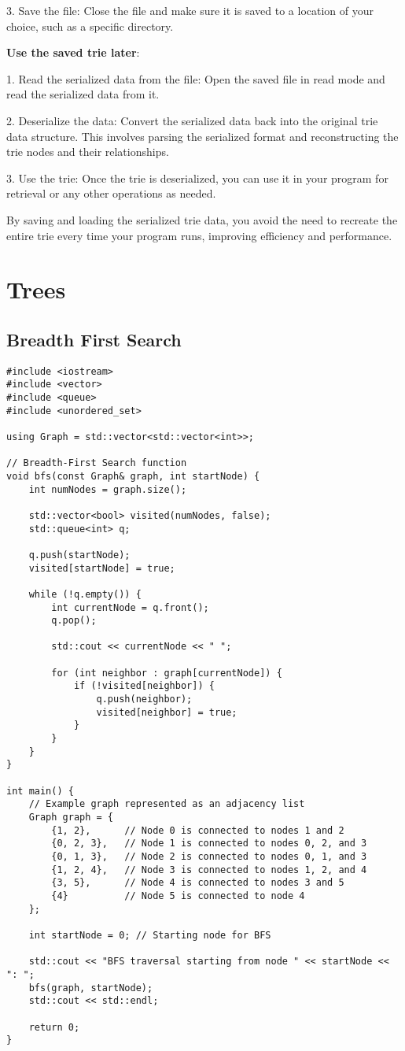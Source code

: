 \documentclass[openany]{report}
\begin{document}
3. Save the file: Close the file and make sure it is saved to a location of your choice,
such as a specific directory.

\textbf{Use the saved trie later}:

1. Read the serialized data from the file:
Open the saved file in read mode and read the serialized data from it.

2. Deserialize the data: Convert the serialized data back into the original trie data structure.
This involves parsing the serialized format and reconstructing the trie nodes and their relationships.

3. Use the trie: Once the trie is deserialized,
you can use it in your program for retrieval or any other operations as needed.

By saving and loading the serialized trie data,
you avoid the need to recreate the entire trie every time your program runs,
improving efficiency and performance.


\section{Trees}

\subsection{Breadth First Search}

\begin{verbatim}
#include <iostream>
#include <vector>
#include <queue>
#include <unordered_set>

using Graph = std::vector<std::vector<int>>;

// Breadth-First Search function
void bfs(const Graph& graph, int startNode) {
    int numNodes = graph.size();

    std::vector<bool> visited(numNodes, false);
    std::queue<int> q;

    q.push(startNode);
    visited[startNode] = true;

    while (!q.empty()) {
        int currentNode = q.front();
        q.pop();

        std::cout << currentNode << " ";

        for (int neighbor : graph[currentNode]) {
            if (!visited[neighbor]) {
                q.push(neighbor);
                visited[neighbor] = true;
            }
        }
    }
}

int main() {
    // Example graph represented as an adjacency list
    Graph graph = {
        {1, 2},      // Node 0 is connected to nodes 1 and 2
        {0, 2, 3},   // Node 1 is connected to nodes 0, 2, and 3
        {0, 1, 3},   // Node 2 is connected to nodes 0, 1, and 3
        {1, 2, 4},   // Node 3 is connected to nodes 1, 2, and 4
        {3, 5},      // Node 4 is connected to nodes 3 and 5
        {4}          // Node 5 is connected to node 4
    };

    int startNode = 0; // Starting node for BFS

    std::cout << "BFS traversal starting from node " << startNode << ": ";
    bfs(graph, startNode);
    std::cout << std::endl;

    return 0;
}
\end{verbatim}
\end{document}
